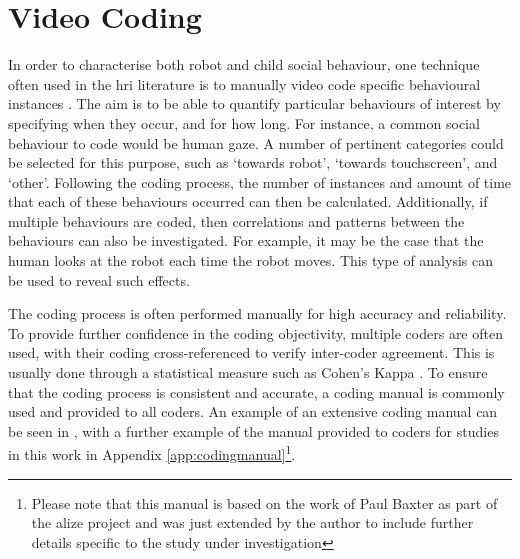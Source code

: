 \section{Video Coding}\label{sec:method-vidcode}
In order to characterise both robot and child social behaviour, one technique often used in the \acrshort{hri} literature is to manually video code specific behavioural instances \citep{kahn2003coding,moshkina2014social,zaga2015effect}. The aim is to be able to quantify particular behaviours of interest by specifying when they occur, and for how long. For instance, a common social behaviour to code would be human gaze. A number of pertinent categories could be selected for this purpose, such as `towards robot', `towards touchscreen', and `other'. Following the coding process, the number of instances and amount of time that each of these behaviours occurred can then be calculated. Additionally, if multiple behaviours are coded, then correlations and patterns between the behaviours can also be investigated. For example, it may be the case that the human looks at the robot each time the robot moves. This type of analysis can be used to reveal such effects.

The coding process is often performed manually for high accuracy and reliability. To provide further confidence in the coding objectivity, multiple coders are often used, with their coding cross-referenced to verify inter-coder agreement. This is usually done through a statistical measure such as Cohen's Kappa \citep{baxter2013emergence}. To ensure that the coding process is consistent and accurate, a coding manual is commonly used and provided to all coders. An example of an extensive coding manual can be seen in \citep{kahn2003coding}, with a further example of the manual provided to coders for studies in this work in Appendix \ref{app:codingmanual}\footnote{Please note that this manual is based on the work of Paul Baxter as part of the \acrshort{alize} project and was just extended by the author to include further details specific to the study under investigation}.


